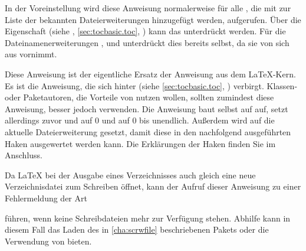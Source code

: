 In der Voreinstellung wird diese Anweisung normalerweise für alle
, die mit  zur
Liste der bekannten Dateierweiterungen hinzugefügt werden, aufgerufen. Über
die Eigenschaft  (siehe
, \autoref{sec:tocbasic.toc},
) kann das unterdrückt werden. Für die
Dateinamenerweiterungen ,  und  unterdrückt
 dies bereits selbst, %
\iftrue%
da  sie von sich aus vornimmt.%
\else%
damit die Umschaltung nicht mehrfach in die zugehörigen Dateien
eingetragen wird.%
\fi
\iffalse%
Normalerweise gibt es keinen Grund, diese Anweisung selbst aufzurufen. Es sind
allerdings Verzeichnisse denkbar, die nicht unter der Kontrolle von
\Package{tocbasic} stehen, also nicht in der Liste der bekannten
Dateierweiterungen geführt werden, aber trotzdem die Spracherweiterung für
\Package{babel} nutzen sollen. Für derartige Verzeichnisse wäre die Anweisung
explizit aufzurufen. Bitte\textnote{Achtung!} achten Sie jedoch darauf, dass
dies für jede Dateierweiterung nur einmal geschieht!%
\fi
\EndIndexGroup


\begin{Declaration}
\end{Declaration}
Diese Anweisung ist der eigentliche Ersatz der Anweisung
 aus dem
\LaTeX-Kern. Es ist die Anweisung, die sich hinter
 (siehe \autoref{sec:tocbasic.toc},
) verbirgt. Klassen- oder Paketautoren,
die Vorteile von  nutzen wollen, sollten zumindest diese
Anweisung, besser jedoch  verwenden. Die
Anweisung baut selbst auf  auf, setzt allerdings zuvor
 und
 auf 0 und
 auf 0 bis unendlich. Außerdem
wird  auf die
aktuelle Dateierweiterung gesetzt, damit diese in den nachfolgend ausgeführten
Haken ausgewertet werden kann. Die Erklärungen der Haken finden
Sie im Anschluss.

Da \LaTeX{} bei der Ausgabe eines Verzeichnisses auch
gleich eine neue Verzeichnisdatei zum Schreiben öffnet, kann der Aufruf dieser
Anweisung zu einer Fehlermeldung der Art
führen, wenn keine Schreibdateien mehr zur Verfügung stehen. Abhilfe kann in
diesem Fall das Laden des in \autoref{cha:scrwfile} beschriebenen Pakets
oder die Verwendung von \LuaLaTeX{} bieten.%
\EndIndexGroup


